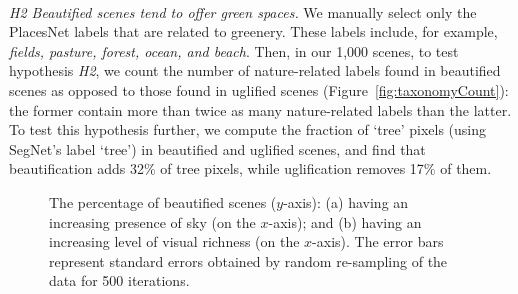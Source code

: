 \mbox{ } \\
\noindent
\emph{H2 Beautified scenes tend to offer green spaces.}
We manually select only the PlacesNet labels that are related to greenery. These labels include, for example, \textit{fields, pasture, forest, ocean, and beach}. Then, in our 1,000 scenes, to test hypothesis \emph{H2}, we count the number of nature-related labels found in beautified scenes as opposed to those found in uglified scenes (Figure~\ref{fig:taxonomyCount}): the former contain more than twice as many nature-related labels than the latter.  To test this hypothesis further, we compute the fraction of `tree' pixels (using SegNet's label `tree') in beautified and uglified scenes, and  find that beautification adds  32\% of tree pixels, while uglification removes 17\% of them. 


\begin{figure}[!t]
    \centering
    \hspace*{-5mm}
    \vspace{-0.4cm}
    \label{fig:bin_figures}
    \caption{The percentage of beautified scenes ($y$-axis): (a) having an increasing presence of sky (on the $x$-axis); and (b) having an increasing level of visual richness  (on the $x$-axis). The error bars represent standard errors obtained by random re-sampling of the data for 500 iterations. }
    \vspace{-0.4cm}
\end{figure}



